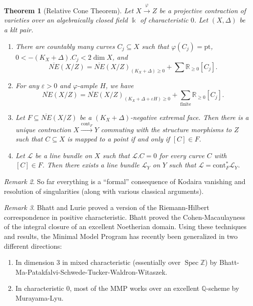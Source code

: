 \documentclass[leqno, openany]{memoir}
\newtheorem{thm}{Theorem}[section]
\theoremstyle{definition}
\theoremstyle{remark}
\newtheorem{rmk}[thm]{Remark}
\theoremstyle{plain}
\theoremstyle{definition}
\theoremstyle{remark}
\newcommand{\R}{\mathbb{R}}
\newcommand{\Z}{\mathbb{Z}}
\newcommand{\Q}{\mathbb{Q}}
\renewcommand{\k}{\Bbbk}
\newcommand{\ep}{\varepsilon}
\newcommand{\mc}[1]{\mathcal{#1}}
\newcommand{\mr}[1]{\mathrm{#1}}
\newcommand{\ol}[1]{\overline{#1}}
\DeclareMathOperator{\Spec}{Spec}
\begin{document}
\begin{thm}[Relative Cone Theorem]
    Let $X \xrightarrow{\varphi} Z$ be a projective contraction of varieties over an algebraically closed field $\k$ of characteristic $0$. Let $(X, \Delta)$ be a klt pair.
    \begin{enumerate}
        \item There are countably many curves $C_j \subseteq X$ such that $\varphi(C_j) = \mr{pt}$, $0 < -(K_X + \Delta). C_j < 2 \dim X$, and 
            \[\ol{NE}(X/Z) = { \ol{NE}(X/Z) }_{(K_X + \Delta)\geq 0} + \sum \R_{\geq 0} [C_j]. \]
        \item For any $\ep > 0$ and $\varphi$-ample $H$, we have
            \[ \ol{NE}(X/Z) = { \ol{NE}(X/Z) }_{(K_X + \Delta + \ep H) \geq 0} + \sum_{\text{finite}} \R_{\geq 0} [C_j]. \]
        \item Let $F \subseteq \ol{NE}(X/Z)$ be a $(K_X + \Delta)$-negative extremal face. Then there is a unique contraction $X \xrightarrow{\mr{cont}_F} Y$ commuting with the structure morphisms to $Z$ such that $C \subseteq X$ is mapped to a point if and only if $[C] \in F$.
        \item Let $\mc{L}$ be a line bundle on $X$ such that $\mc{L}.C = 0$ for every curve $C$ with $[C] \in F$. Then there exists a line bundle $\mc{L}_Y$ on $Y$ such that $\mc{L} = \mr{cont}_F^* \mc{L}_Y$.
    \end{enumerate}
\end{thm}

\begin{rmk}
    So far everything is a ``formal'' consequence of Kodaira vanishing and resolution of singularities (along with various classical arguments).
\end{rmk}

\begin{rmk}
    Bhatt and Lurie proved a version of the Riemann-Hilbert correspondence in positive characteristic. Bhatt proved the Cohen-Macaulayness of the integral closure of an excellent Noetherian domain. Using these techniques and results, the Minimal Model Program has recently been generalized in two different directions:
    \begin{enumerate}
        \item In dimension $3$ in mixed characteristic (essentially over $\Spec \Z$) by Bhatt-Ma-Patakfalvi-Schwede-Tucker-Waldron-Witaszek.
        \item In characteristic $0$, most of the MMP works over an excellent $\Q$-scheme by Murayama-Lyu.
    \end{enumerate}
\end{rmk}
\end{document}
